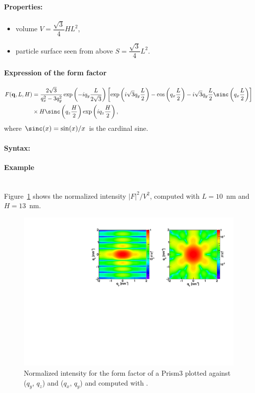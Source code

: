 \paragraph{Properties:}
\begin{itemize}
\item volume $V= \dfrac{\sqrt{3}}{4} H L^2$,
\item particle surface seen from above $S =\dfrac{\sqrt{3}}{4}L^2$.

\end{itemize}

\paragraph{Expression of the form factor}
\begin{align*}
F(\mathbf{q},L, H) &= \frac{2 \sqrt{3}}{q_x^2-3q_y^2}  \exp\left(-i q_y\frac{L}{2\sqrt{3}}\right)\left[\exp\left(i \sqrt{3} q_y \frac{L}{2} \right)-\cos\left(q_x \frac{L}{2}\right)-i \sqrt{3} q_y \frac{L}{2} \sinc\left(q_x \frac{L}{2}\right) \right] \\
  &
\times  H \sinc\left(q_z \frac{H}{2} \right) \exp\left(i q_z \frac{H}{2}\right),
\end{align*}
where $\sinc(x)=\sin(x)/x$ is the cardinal sine.

\paragraph{Syntax:} 

\paragraph{Example}\mbox{}\\
Figure~\ref{fig:FFprism3Ex} shows the normalized intensity
$|F|^2/V^2$, computed with $L=10$~nm and \mbox{$H=13$~nm.}
\begin{figure}[ht]
\begin{center}
\includegraphics[angle=-90,width=\textwidth]{Figures/ff/figffprism3.pdf}
\end{center}
\caption{Normalized intensity for the form factor of a Prism3
 plotted against ($q_y$, $q_z$) and  ($q_x$, $q_y$) and
  computed with .}
\label{fig:FFprism3Ex}
\end{figure}

